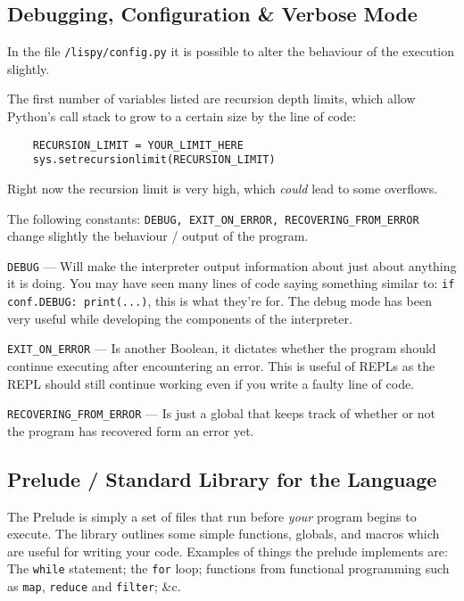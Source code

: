 \documentclass{article}
\newcommand{\code}[1]{\texttt{#1}}
\newcommand{\etc}{{\&}c.}
\begin{document}
    \clearpage

  \subsection{Debugging, Configuration \& Verbose Mode}
    In the file \code{/lispy/config.py} it is possible to alter
    the behaviour of the execution slightly.

    The first number of variables listed are recursion depth limits,
    which allow Python's call stack to grow to a certain size by
    the line of code:

    \begin{verbatim}
    RECURSION_LIMIT = YOUR_LIMIT_HERE
    sys.setrecursionlimit(RECURSION_LIMIT)
    \end{verbatim}

    Right now the recursion limit is very high, which \emph{could} lead
    to some overflows.

    The following constants: \code{DEBUG, EXIT\_ON\_ERROR, RECOVERING\_FROM\_ERROR}
    change slightly the behaviour / output of the program.

    \code{DEBUG} --- Will make the interpreter output information about
    just about anything it is doing. You may have seen many lines of code
    saying something similar to: \code{if conf.DEBUG: print(...)},
    this is what they're for. The debug mode has been very useful while
    developing the components of the interpreter.

    \code{EXIT\_ON\_ERROR} --- Is another Boolean, it dictates whether the
    program should continue executing after encountering an error.
    This is useful of REPLs as the REPL should still continue working
    even if  you write a faulty line of code.

    \code{RECOVERING\_FROM\_ERROR} --- Is just a global that keeps
    track of whether or not the program has recovered form an error yet.

  \subsection{Prelude / Standard Library for the Language}
    The Prelude is simply a set of files that run before \emph{your} program
    begins to execute. The library outlines some simple functions, globals, and
    macros which are useful for writing your code. Examples of things the prelude
    implements are: The \code{while} statement; the \code{for} loop; functions
    from functional programming such as \code{map}, \code{reduce} and \code{filter};
    \etc
\end{document}

